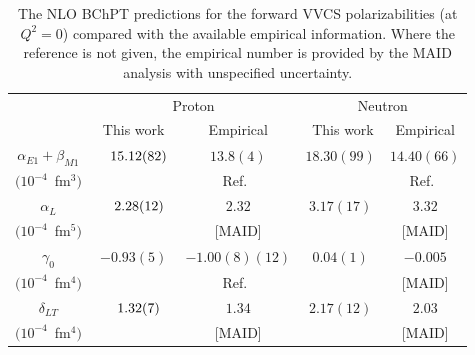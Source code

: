 \documentclass[twocolumn,prc,showpacs,nofootinbib,preprintnumbers,amsmath,amssymb,superscriptaddress]{revtex4-1}
\def\hpm{\hphantom{-}}
\begin{document}
\begin{table}[tb]
\begin{tabular}{c|c|c||c|c|}
\cline{2-5} 
&  \multicolumn{2}{|c||}{ Proton} & 
\multicolumn{2}{|c|}{Neutron} \\
\cline{2-5} 
  & \, This work \, & Empirical   & \, This work\, & \,\,Empirical\,\, \\
\hline
\multicolumn{1}{|c|}{$\alpha_{E1}+\beta_{M1}$} &$\hpm15.12(82)$ & $13.8(4)$ &$18.30(99)$  &$14.40(66)$\\
\multicolumn{1}{|c|}{$(10^{-4}$~fm$^3)$} & & Ref.~\cite{OlmosdeLeon:2001zn}& &Ref.~\cite{Babusci:1997ij}\\
\hline
\multicolumn{1}{|c|}{$\alpha_L$} &$\hpm2.28(12)$ & $2.32$ & $3.17(17)$  & $3.32$\\
\multicolumn{1}{|c|}{$(10^{-4}$~fm$^5)$} &&[MAID]&&[MAID]\\
\hline
\multicolumn{1}{|c|}{$\,\gamma_0 \,$} & $-0.93(5)$ &$-1.00(8)(12) $ &$0.04(1)$ & $-0.005$ \\
\multicolumn{1}{|c|}{$(10^{-4}$~fm$^4)$} &   &Ref.~\cite{Dutz:2003mm}&& [MAID]\\
\hline
\multicolumn{1}{|c|}{$\delta_{LT}$} & $\hpm1.32(7)$  & $1.34$& $2.17(12)$ & $2.03$\\
\multicolumn{1}{|c|}{$(10^{-4}$~fm$^4)$} &&[MAID]&&[MAID]\\
\hline
\end{tabular}
\caption{The NLO BChPT predictions for the forward VVCS polarizabilities (at $Q^2=0$)
compared with the available empirical information. Where the reference is
not given, the empirical number is provided by the MAID analysis \cite{Drechsel:2000ct,MAID} with unspecified uncertainty.
\label{Table:Results-Pol}}
\end{table}
\end{document}
